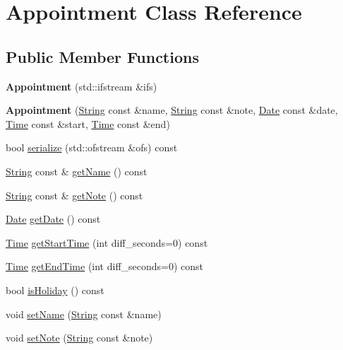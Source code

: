 \hypertarget{classAppointment}{}\section{Appointment Class Reference}
\label{classAppointment}
\subsection*{Public Member Functions}
\begin{DoxyCompactItemize}
\item 
\mbox{\label{classAppointment_a3b5b82331c630dcce3b1e724d0e6c48e}} 
{\bfseries Appointment} (std\+::ifstream \&ifs)
\item 
\mbox{\label{classAppointment_a5ad76b006f94741008318f0a5053b7a0}} 
{\bfseries Appointment} (\hyperlink{classString}{String} const \&name, \hyperlink{classString}{String} const \&note, \hyperlink{classDate}{Date} const \&date, \hyperlink{classTime}{Time} const \&start, \hyperlink{classTime}{Time} const \&end)
\item 
bool \hyperlink{classAppointment_a2542a8dd24e926a2531f1d88bbf4dd88}{serialize} (std\+::ofstream \&ofs) const
\item 
\hyperlink{classString}{String} const  \& \hyperlink{classAppointment_ab2cbd469ff67c37c34a91c02a1ba9d35}{get\+Name} () const
\item 
\hyperlink{classString}{String} const  \& \hyperlink{classAppointment_aaf6078fe8f092e321a38d173bc7093c3}{get\+Note} () const
\item 
\hyperlink{classDate}{Date} \hyperlink{classAppointment_ac4f82720deaa4daf6679d1c60fadfb67}{get\+Date} () const
\item 
\hyperlink{classTime}{Time} \hyperlink{classAppointment_a577870c4d05eb584d58c61c98b9b65a0}{get\+Start\+Time} (int diff\+\_\+seconds=0) const
\item 
\hyperlink{classTime}{Time} \hyperlink{classAppointment_a5ba3b128ad963c9676af3fb199b98613}{get\+End\+Time} (int diff\+\_\+seconds=0) const
\item 
bool \hyperlink{classAppointment_a0307e814d106ba2b2314a28a9701efae}{is\+Holiday} () const
\item 
void \hyperlink{classAppointment_a65ff6f9a246d1bf437cb0be725841a84}{set\+Name} (\hyperlink{classString}{String} const \&name)
\item 
void \hyperlink{classAppointment_a367bc61167a71691ba150808968f3b8c}{set\+Note} (\hyperlink{classString}{String} const \&note)

\end{DoxyCompactItemize}
